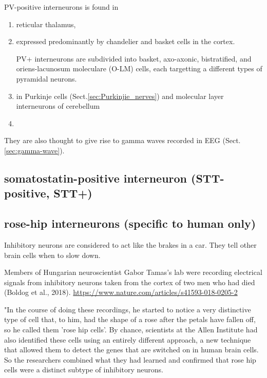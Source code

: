 PV-positive interneurons is found in 
\begin{enumerate}
  \item reticular thalamus, 
  
  \item expressed predominantly by chandelier and basket cells in the cortex.

PV+ interneurons are subdivided into basket, axo-axonic, bistratified, and
oriens-lacunosum moleculare (O-LM) cells, each targetting a different types of
pyramidal neurons.

  
  \item in Purkinje cells (Sect.\ref{sec:Purkinjie_nerves}) and molecular layer
  interneurons of cerebellum
  
  \item 
\end{enumerate}

They are also thought to give rise to gamma waves recorded in EEG
(Sect.\ref{sec:gamma-wave}).

\subsection{somatostatin-positive interneuron (STT-positive, STT+)}
\label{sec:somatostatin-positive-interneuron}
\label{sec:STT-positive-interneuron}

\subsection{rose-hip interneurons (specific to human only)}

Inhibitory neurons are considered to act like the brakes in a car. They tell
other brain cells when to slow down.

Members of Hungarian neuroscientist Gabor Tamas's lab were recording electrical
signals from inhibitory neurons taken from the cortex of two men who had died
(Boldog et al., 2018).
\url{https://www.nature.com/articles/s41593-018-0205-2}

"In the course of doing these recordings, he started to notice a very
distinctive type of cell that, to him, had the shape of a rose after the petals
have fallen off, so he called them 'rose hip cells'.
By chance, scientists at the Allen Institute had also identified these cells
using an entirely different approach, a new technique that allowed them to
detect the genes that are switched on in human brain cells.
So the researchers combined what they had learned and confirmed that rose hip
cells were a distinct subtype of inhibitory neurons.

